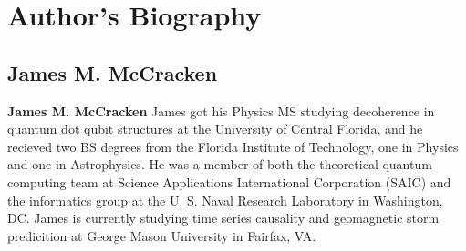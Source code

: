 \blankpage

\chapter*{Author's Biography}


\section*{James M. McCracken}

\textbf{James M. McCracken}
James got his Physics MS studying decoherence in quantum dot qubit structures at the University of Central Florida, and he recieved two BS degrees from the Florida Institute of Technology, one in Physics and one in Astrophysics.  He was a member of both the theoretical quantum computing team at Science Applications International Corporation (SAIC) and the informatics group at the U. S. Naval Research Laboratory in Washington, DC.  James is currently studying time series causality and geomagnetic storm predicition at George Mason University in Fairfax, VA.

